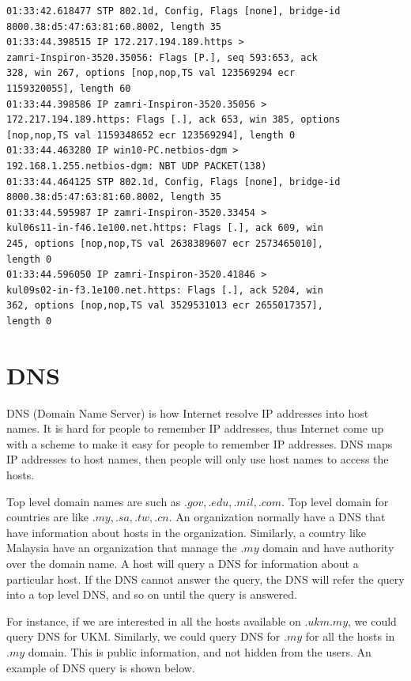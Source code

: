 \documentclass[7x9]{times}
\begin{document}
\begin{verbatim}
01:33:42.618477 STP 802.1d, Config, Flags [none], bridge-id 
8000.38:d5:47:63:81:60.8002, length 35
01:33:44.398515 IP 172.217.194.189.https > 
zamri-Inspiron-3520.35056: Flags [P.], seq 593:653, ack 
328, win 267, options [nop,nop,TS val 123569294 ecr 
1159320055], length 60
01:33:44.398586 IP zamri-Inspiron-3520.35056 > 
172.217.194.189.https: Flags [.], ack 653, win 385, options 
[nop,nop,TS val 1159348652 ecr 123569294], length 0
01:33:44.463280 IP win10-PC.netbios-dgm > 
192.168.1.255.netbios-dgm: NBT UDP PACKET(138)
01:33:44.464125 STP 802.1d, Config, Flags [none], bridge-id 
8000.38:d5:47:63:81:60.8002, length 35
01:33:44.595987 IP zamri-Inspiron-3520.33454 > 
kul06s11-in-f46.1e100.net.https: Flags [.], ack 609, win 
245, options [nop,nop,TS val 2638389607 ecr 2573465010], 
length 0
01:33:44.596050 IP zamri-Inspiron-3520.41846 > 
kul09s02-in-f3.1e100.net.https: Flags [.], ack 5204, win 
362, options [nop,nop,TS val 3529531013 ecr 2655017357], 
length 0
\end{verbatim}














\section{DNS}

DNS (Domain Name Server) is how Internet resolve IP
addresses into host names. It is hard for people to remember
IP addresses, thus Internet come up with a scheme to make it
easy for people to remember IP addresses. DNS maps  IP 
addresses to host names, then people will only use host 
names to access the hosts. 

Top level domain names are such as $.gov, .edu, .mil, .com$.
Top level domain for countries are like $.my, .sa, .tw,
.cn$. An organization normally have a DNS that have 
information about hosts in the organization. Similarly, a 
country like Malaysia have an organization that manage the 
$.my$ domain and have authority over the domain name.
A host will query a  DNS for information about a particular
host. If the DNS cannot answer the query, the DNS will refer
the query into a top level DNS, and so on until the query is
answered.

For instance, if we are interested in all the hosts
available on $.ukm.my$, we could query DNS for UKM.
Similarly, we could query DNS for $.my$ for all the hosts in
$.my$ domain. This is public information, and not hidden
from the users. An example of DNS query is shown below.
\end{document}
